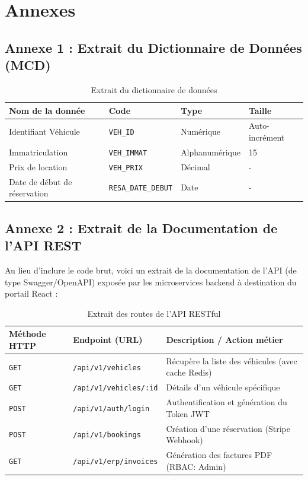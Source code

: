 \chapter*{Annexes}

\section*{Annexe 1 : Extrait du Dictionnaire de Données (MCD)}
\begin{table}[H]
    \centering
    \begin{tabular}{|l|l|l|l|}
        \hline
        \textbf{Nom de la donnée} & \textbf{Code} & \textbf{Type} & \textbf{Taille} \\
        \hline
        Identifiant Véhicule & \texttt{VEH\_ID} & Numérique & Auto-incrément \\
        Immatriculation & \texttt{VEH\_IMMAT} & Alphanumérique & 15 \\
        Prix de location & \texttt{VEH\_PRIX} & Décimal & - \\
        Date de début de réservation & \texttt{RESA\_DATE\_DEBUT} & Date & - \\
        \hline
    \end{tabular}
    \caption{Extrait du dictionnaire de données}
\end{table}

\section*{Annexe 2 : Extrait de la Documentation de l'API REST}
Au lieu d'inclure le code brut, voici un extrait de la documentation de l'API (de type Swagger/OpenAPI) exposée par les microservices backend à destination du portail React :
\begin{table}[H]
    \centering
    \renewcommand{\arraystretch}{1.3}
    \begin{tabular}{|l|l|p{8cm}|}
        \hline
        \textbf{Méthode HTTP} & \textbf{Endpoint (URL)} & \textbf{Description / Action métier} \\
        \hline
        \texttt{GET} & \texttt{/api/v1/vehicles} & Récupère la liste des véhicules (avec cache Redis) \\
        \texttt{GET} & \texttt{/api/v1/vehicles/:id} & Détails d'un véhicule spécifique \\
        \texttt{POST} & \texttt{/api/v1/auth/login} & Authentification et génération du Token JWT \\
        \texttt{POST} & \texttt{/api/v1/bookings} & Création d'une réservation (Stripe Webhook) \\
        \texttt{GET} & \texttt{/api/v1/erp/invoices} & Génération des factures PDF (RBAC: Admin) \\
        \hline
    \end{tabular}
    \caption{Extrait des routes de l'API RESTful}
\end{table}

